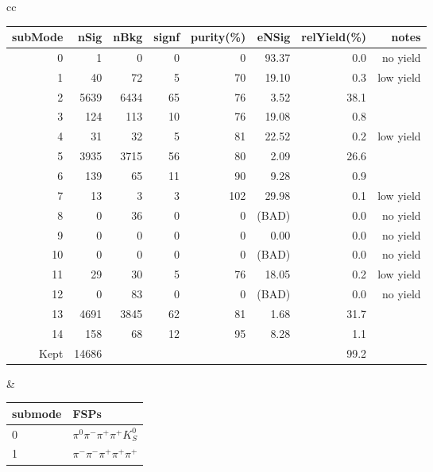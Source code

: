 \begin{table}[h!]
\begin{center}
\begin{tabular}{cc}

\begin{tabular}{|rrrrrrrr|}
\hline
subMode  &  nSig &  nBkg &  signf&  purity(\%)&eNSig & relYield(\%)  & notes\\
\hline
0        &  1    &  0    &  0    &  0        &  93.37& 0.0           & no yield\\
1        &  40   &  72   &  5    &  70       &  19.10& 0.3           & low yield\\
2        &  5639 &  6434 &  65   &  76       &  3.52 & 38.1          &\\
3        &  124  &  113  &  10   &  76       &  19.08& 0.8           &\\
4        &  31   &  32   &  5    &  81       &  22.52& 0.2           & low yield\\
5        &  3935 &  3715 &  56   &  80       &  2.09 & 26.6          &\\
6        &  139  &  65   &  11   &  90       &  9.28 & 0.9           &\\
7        &  13   &  3    &  3    &  102      &  29.98& 0.1           & low yield\\
8        &  0    &  36   &  0    &  0        &  (BAD)& 0.0           & no yield\\
9        &  0    &  0    &  0    &  0        &  0.00 & 0.0           & no yield\\
10       &  0    &  0    &  0    &  0        &  (BAD)& 0.0           & no yield\\
11       &  29   &  30   &  5    &  76       &  18.05& 0.2           & low yield\\
12       &  0    &  83   &  0    &  0        &  (BAD)& 0.0           & no yield\\
13       &  4691 &  3845 &  62   &  81       &  1.68 & 31.7          &\\
14       &  158  &  68   &  12   &  95       &  8.28 & 1.1           &\\
\hline
Kept&14686&&&&&99.2&\\
\hline
\end{tabular}
&
\begin{tabular}{|ll|}
\hline
submode& FSPs\\
\hline
0 & $\pi^0 \pi^- \pi^+ \pi^+ K_S^0 $ \\
1 & $\pi^- \pi^- \pi^+ \pi^+ \pi^+ $ \\

\end{tabular}
\end{tabular}
\end{center}
\end{table}
